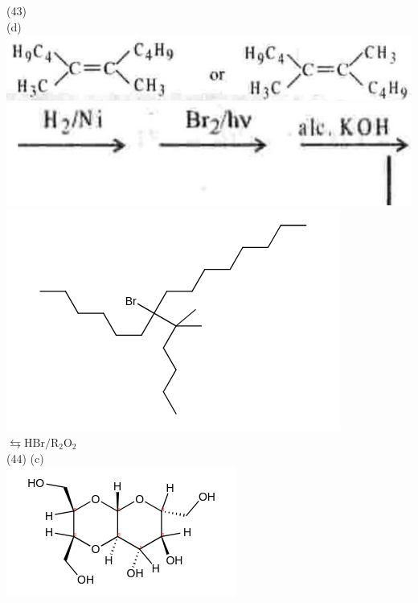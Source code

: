 \documentclass[10pt]{article}
\begin{document}
(43)\\
(d)\\
\includegraphics[max width=\textwidth, center]{2025_01_28_8470952b98110cec3aabg-165(3)}\\
\includegraphics[max width=\textwidth, center]{2025_01_28_8470952b98110cec3aabg-165(1)}\\
\includegraphics{smile-496f27868068b44713d25c26592ee118c7a2cf14}\\
$\leftrightarrows \mathrm{HBr} / \mathrm{R}_{2} \mathrm{O}_{2}$\\
(44) (c)\\
\includegraphics{smile-1c763c3b1f66d6934ec2d3d057c9778577c04f6c}
\end{document}
